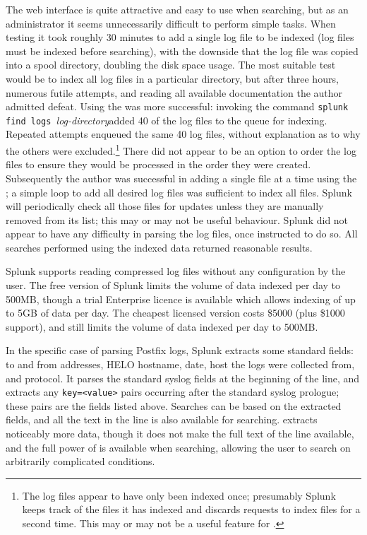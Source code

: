 The web interface is quite attractive and easy to use when searching, but
as an administrator it seems unnecessarily difficult to perform simple
tasks.  When testing it took roughly 30 minutes to add a single log file to
be indexed (log files must be indexed before searching), with the downside
that the log file was copied into a spool directory, doubling the disk
space usage.  The most suitable test would be to index all log files in a
particular directory, but after three hours, numerous futile attempts, and
reading all available documentation the author admitted defeat.  Using the
\CLI{} was more successful: invoking the command \newline \tab{}
\texttt{splunk find logs }\textit{log-directory\/}\newline added 40 of the
\numberOFlogFILES{} log files to the queue for indexing.  Repeated attempts
enqueued the same 40 log files, without explanation as to why the others
were excluded.\footnote{The log files appear to have only been indexed
once; presumably Splunk keeps track of the files it has indexed and
discards requests to index files for a second time.  This may or may not be
a useful feature for \parsername{}.} There did not appear to be an option
to order the log files to ensure they would be processed in the order they
were created.  Subsequently the author was successful in adding a single
file at a time using the \CLI{}; a simple loop to add all desired log files
was sufficient to index all files.  Splunk will periodically check all
those files for updates unless they are manually removed from its list;
this may or may not be useful behaviour.  Splunk did not appear to have any
difficulty in parsing the log files, once instructed to do so.  All
searches performed using the indexed data returned reasonable results.

Splunk supports reading compressed log files without any configuration by
the user.  The free version of Splunk limits the volume of data indexed per
day to 500MB, though a trial Enterprise licence is available which allows
indexing of up to 5GB of data per day.  The cheapest licensed version costs
\$5000 (plus \$1000 support), and still limits the volume of data indexed
per day to 500MB.

In the specific case of parsing Postfix logs, Splunk extracts some standard
fields: to and from addresses, HELO hostname, date, host the logs were
collected from, and protocol.  It parses the standard syslog fields at the
beginning of the line, and extracts any \texttt{key=<value>} pairs
occurring after the standard syslog prologue; these pairs are the fields
listed above.  Searches can be based on the extracted fields, and all the
text in the line is also available for searching.  \parsername{} extracts
noticeably more data, though it does not make the full text of the line
available, and the full power of \SQL{} is available when searching,
allowing the user to search on arbitrarily complicated conditions.

